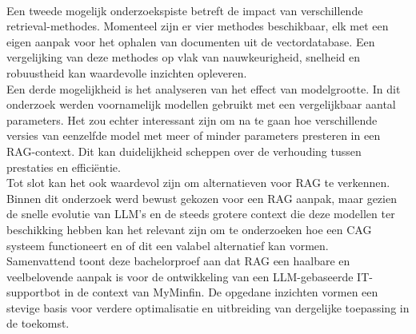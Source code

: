 \\[1em]
Een tweede mogelijk onderzoekspiste betreft de impact van verschillende retrieval-methodes. Momenteel zijn er vier methodes beschikbaar, elk met een eigen aanpak voor het ophalen van documenten uit de vectordatabase. Een vergelijking van deze methodes op vlak van nauwkeurigheid, snelheid en robuustheid kan waardevolle inzichten opleveren.
\\[1em]
Een derde mogelijkheid is het analyseren van het effect van modelgrootte. In dit onderzoek werden voornamelijk modellen gebruikt met een vergelijkbaar aantal parameters. Het zou echter interessant zijn om na te gaan hoe verschillende versies van eenzelfde model met meer of minder parameters presteren in een RAG-context. Dit kan duidelijkheid scheppen over de verhouding tussen prestaties en efficiëntie.
\\[1em]
Tot slot kan het ook waardevol zijn om alternatieven voor RAG te verkennen. Binnen dit onderzoek werd bewust gekozen voor een RAG aanpak, maar gezien de snelle evolutie van LLM's en de steeds grotere context die deze modellen ter beschikking hebben kan het relevant zijn om te onderzoeken hoe een CAG systeem functioneert en of dit een valabel alternatief kan vormen.
\\[1em]
Samenvattend toont deze bachelorproef aan dat RAG een haalbare en veelbelovende aanpak is voor de ontwikkeling van een LLM-gebaseerde IT-supportbot in de context van MyMinfin. De opgedane inzichten vormen een stevige basis voor verdere optimalisatie en uitbreiding van dergelijke toepassing in de toekomst.